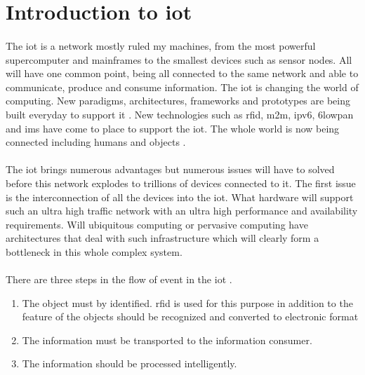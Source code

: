 \documentclass[oneside,12pt,a4paper,final]{book}
\begin{document}
\section{Introduction to \gls{iot}}
\paragraph{}
The \gls{iot} is a network mostly ruled my machines, from the most powerful supercomputer and mainframes to the smallest devices such as sensor nodes. All will have one common point, being all connected to the same network and able to communicate, produce and consume information. The \gls{iot} is changing the world of computing. New paradigms, architectures, frameworks and prototypes are being built everyday to support it \cite{ref15}. New technologies such as \gls{rfid}, \gls{m2m}, \gls{ipv6}, \gls{6lowpan} and \gls{ims} have come to place to support the \gls{iot}. The whole world is now being connected including humans and objects \cite{ref18}.
\paragraph{}
The \gls{iot} brings numerous advantages but numerous issues will have to solved before this network explodes to trillions of devices connected to it. The first issue is the interconnection of all the devices into the \gls{iot}. What hardware will support such an ultra high traffic network with an ultra high performance and availability requirements. Will ubiquitous computing or pervasive computing have architectures that deal with such infrastructure which will clearly form a bottleneck in this whole complex system.
\paragraph{}
There are three steps in the flow of event in the \gls{iot} \cite{ref17}.
\begin{enumerate}
\item The object must by identified. \gls{rfid} is used for this purpose in addition to the feature of the objects should be recognized and converted to electronic format
\item  The information must be transported to the information consumer.
\item The information should be processed intelligently.
\end{enumerate}
\end{document}
